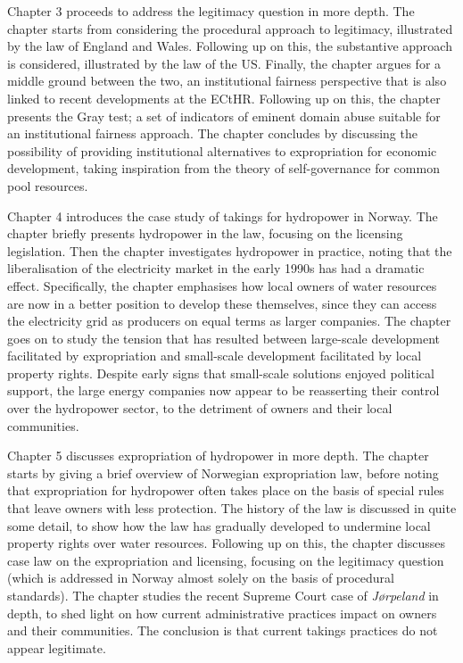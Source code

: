 Chapter 3 proceeds to address the legitimacy question in more depth. The chapter starts from considering the procedural approach to legitimacy, illustrated by the law of England and Wales. Following up on this, the substantive approach is considered, illustrated by the law of the US. Finally, the chapter argues for a middle ground between the two, an institutional fairness perspective that is also linked to recent developments at the ECtHR. Following up on this, the chapter presents the Gray test; a set of indicators of eminent domain abuse suitable for an institutional fairness approach. The chapter concludes by discussing the possibility of providing institutional alternatives to expropriation for economic development, taking inspiration from the theory of self-governance for common pool resources.

Chapter 4 introduces the case study of takings for hydropower in Norway. The chapter briefly presents hydropower in the law, focusing on the licensing legislation. Then the chapter investigates hydropower in practice, noting that the liberalisation of the electricity market in the early 1990s has had a dramatic effect. Specifically, the chapter emphasises how local owners of water resources are now in a better position to develop these themselves, since they can access the electricity grid as producers on equal terms as larger companies. The chapter goes on to study the tension that has resulted between large-scale development facilitated by expropriation and small-scale development facilitated by local property rights. Despite early signs that small-scale solutions enjoyed political support, the large energy companies now appear to be reasserting their control over the hydropower sector, to the detriment of owners and their local communities.

Chapter 5 discusses expropriation of hydropower in more depth. The chapter starts by giving a brief overview of Norwegian expropriation law, before noting that expropriation for hydropower often takes place on the basis of special rules that leave owners with less protection. The history of the law is discussed in quite some detail, to show how the law has gradually developed to undermine local property rights over water resources. Following up on this, the chapter discusses case law on the expropriation and licensing, focusing on the legitimacy question (which is addressed in Norway almost solely on the basis of procedural standards). The chapter studies the recent Supreme Court case of {\it Jørpeland} in depth, to shed light on how current administrative practices impact on owners and their communities. The conclusion is that current takings practices do not appear legitimate.

